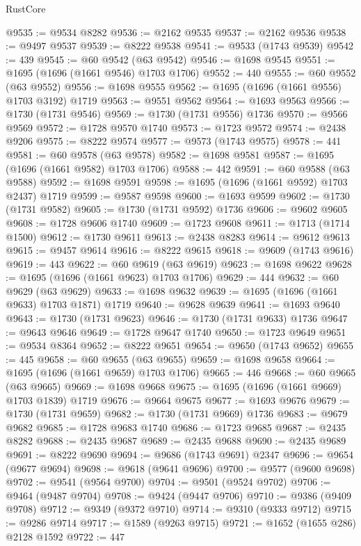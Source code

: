 \begin{lexlean}{RustCore}
\begin{coremodule}
@9535 := @9534 @8282
@9536 := @2162 @9535
@9537 := @2162 @9536
@9538 := @9497 @9537
@9539 := @8222 @9538
@9541 := @9533 (@1743 @9539)
@9542 := 439
@9545 := @60 @9542 (@63 @9542)
@9546 := @1698 @9545
@9551 := @1695 (@1696 (@1661 @9546) @1703 @1706)
@9552 := 440
@9555 := @60 @9552 (@63 @9552)
@9556 := @1698 @9555
@9562 := @1695 (@1696 (@1661 @9556) @1703 @3192) @1719
@9563 := @9551 @9562
@9564 := @1693 @9563
@9566 := @1730 (@1731 @9546)
@9569 := @1730 (@1731 @9556) @1736
@9570 := @9566 @9569
@9572 := @1728 @9570 @1740
@9573 := @1723 @9572
@9574 := @2438 @9206
@9575 := @8222 @9574
@9577 := @9573 (@1743 @9575)
@9578 := 441
@9581 := @60 @9578 (@63 @9578)
@9582 := @1698 @9581
@9587 := @1695 (@1696 (@1661 @9582) @1703 @1706)
@9588 := 442
@9591 := @60 @9588 (@63 @9588)
@9592 := @1698 @9591
@9598 := @1695 (@1696 (@1661 @9592) @1703 @2437) @1719
@9599 := @9587 @9598
@9600 := @1693 @9599
@9602 := @1730 (@1731 @9582)
@9605 := @1730 (@1731 @9592) @1736
@9606 := @9602 @9605
@9608 := @1728 @9606 @1740
@9609 := @1723 @9608
@9611 := @1713 (@1714 @1500)
@9612 := @1730 @9611
@9613 := @2438 @8283
@9614 := @9612 @9613
@9615 := @9457 @9614
@9616 := @8222 @9615
@9618 := @9609 (@1743 @9616)
@9619 := 443
@9622 := @60 @9619 (@63 @9619)
@9623 := @1698 @9622
@9628 := @1695 (@1696 (@1661 @9623) @1703 @1706)
@9629 := 444
@9632 := @60 @9629 (@63 @9629)
@9633 := @1698 @9632
@9639 := @1695 (@1696 (@1661 @9633) @1703 @1871) @1719
@9640 := @9628 @9639
@9641 := @1693 @9640
@9643 := @1730 (@1731 @9623)
@9646 := @1730 (@1731 @9633) @1736
@9647 := @9643 @9646
@9649 := @1728 @9647 @1740
@9650 := @1723 @9649
@9651 := @9534 @8364
@9652 := @8222 @9651
@9654 := @9650 (@1743 @9652)
@9655 := 445
@9658 := @60 @9655 (@63 @9655)
@9659 := @1698 @9658
@9664 := @1695 (@1696 (@1661 @9659) @1703 @1706)
@9665 := 446
@9668 := @60 @9665 (@63 @9665)
@9669 := @1698 @9668
@9675 := @1695 (@1696 (@1661 @9669) @1703 @1839) @1719
@9676 := @9664 @9675
@9677 := @1693 @9676
@9679 := @1730 (@1731 @9659)
@9682 := @1730 (@1731 @9669) @1736
@9683 := @9679 @9682
@9685 := @1728 @9683 @1740
@9686 := @1723 @9685
@9687 := @2435 @8282
@9688 := @2435 @9687
@9689 := @2435 @9688
@9690 := @2435 @9689
@9691 := @8222 @9690
@9694 := @9686 (@1743 @9691) @2347
@9696 := @9654 (@9677 @9694)
@9698 := @9618 (@9641 @9696)
@9700 := @9577 (@9600 @9698)
@9702 := @9541 (@9564 @9700)
@9704 := @9501 (@9524 @9702)
@9706 := @9464 (@9487 @9704)
@9708 := @9424 (@9447 @9706)
@9710 := @9386 (@9409 @9708)
@9712 := @9349 (@9372 @9710)
@9714 := @9310 (@9333 @9712)
@9715 := @9286 @9714
@9717 := @1589 (@9263 @9715)
@9721 := @1652 (@1655 @286) @2128 @1592
@9722 := 447

\end{coremodule}
\end{lexlean}
